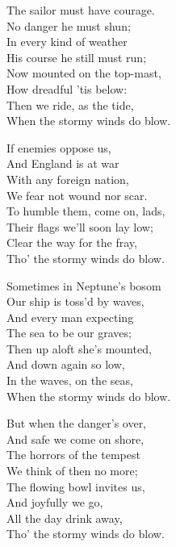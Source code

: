 \settowidth{\versewidth}{When the stormy winds do blow.}
\begin{dcverse}
\begin{altverse}
The sailor must have courage.\\
No danger he must shun;\\
In every kind of weather\\
His course he still must run;\\
Now mounted on the top-mast,\\
How dreadful ’tis below:\\
Then we ride, as the tide,\\
When the stormy winds do blow.
\end{altverse}

\begin{altverse}
If enemies oppose us,\\
And England is at war\\
With any foreign nation,\\
We fear not wound nor scar.\\
To humble them, come on, lads,\\
Their flags we’ll soon lay low;\\
Clear the way for the fray,\\
Tho’ the stormy winds do blow.
\end{altverse}

\begin{altverse}
Sometimes in Neptune’s bosom\\
Our ship is toss’d by waves,\\
And every man expecting\\
The sea to be our graves;\\
Then up aloft she’s mounted,\\
And down again so low,\\
In the waves, on the seas,\\
When the stormy winds do blow.
\end{altverse}

\begin{altverse}
But when the danger’s over,\\
And safe we come on shore,\\
The horrors of the tempest\\
We think of then no more;\\
The flowing bowl invites us,\\
And joyfully we go,\\
All the day drink away,\\
Tho’ the stormy winds do blow.
\end{altverse}
\end{dcverse}
\pagebreak

